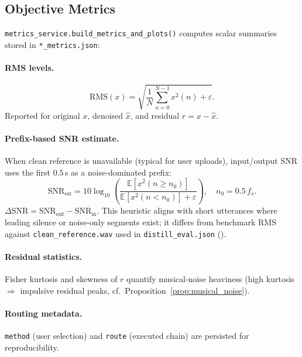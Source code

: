 \subsection{Objective Metrics}

\texttt{metrics\_service.build\_metrics\_and\_plots()} computes scalar summaries stored in \texttt{*\_metrics.json}:

\paragraph{RMS levels.}
\begin{equation}
  \mathrm{RMS}(x) = \sqrt{\frac{1}{N}\sum_{n=0}^{N-1} x^2(n) + \varepsilon}.
\end{equation}
Reported for original $x$, denoised $\hat{x}$, and residual $r = x - \hat{x}$.

\paragraph{Prefix-based SNR estimate.}
When clean reference is unavailable (typical for user uploads), input/output SNR uses the first $0.5$\,s as a noise-dominated prefix:
\begin{equation}
  \mathrm{SNR}_{\mathrm{est}} = 10\log_{10}\!\left(
    \frac{\mathbb{E}[x^2(n \ge n_0)]}{\mathbb{E}[x^2(n < n_0)] + \varepsilon}
  \right), \quad n_0 = 0.5\,f_s.
  \label{eq:prefix_snr}
\end{equation}
$\Delta\mathrm{SNR} = \mathrm{SNR}_{\mathrm{out}} - \mathrm{SNR}_{\mathrm{in}}$. This heuristic aligns with short utterances where leading silence or noise-only segments exist; it differs from benchmark RMS against \texttt{clean\_reference.wav} used in \texttt{distill\_eval.json} ().

\paragraph{Residual statistics.}
Fisher kurtosis and skewness of $r$ quantify musical-noise heaviness (high kurtosis $\Rightarrow$ impulsive residual peaks, cf.\ Proposition~\ref{prop:musical_noise}).

\paragraph{Routing metadata.}
\texttt{method} (user selection) and \texttt{route} (executed chain) are persisted for reproducibility.


